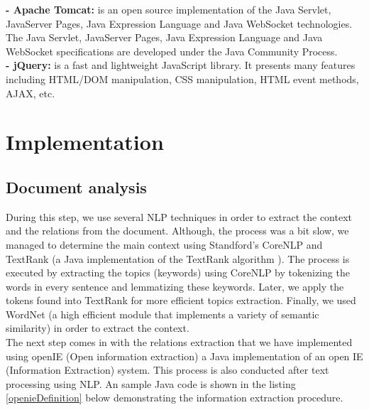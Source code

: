 \textbf{- Apache Tomcat:} is an open source implementation of the Java Servlet, JavaServer Pages, Java Expression Language and Java WebSocket technologies. The Java Servlet, JavaServer Pages, Java Expression Language and Java WebSocket specifications are developed under the Java Community Process. \\

\textbf{- jQuery:} is a fast and lightweight JavaScript library. It presents many features including HTML/DOM manipulation, CSS manipulation, HTML event methods, AJAX, etc.

\section{Implementation}
\subsection{Document analysis}

During this step, we use several NLP techniques in order to extract the context and the relations from the document. Although, the process was a bit slow, we managed to determine the main context using Standford's CoreNLP and TextRank (a Java implementation of  the TextRank algorithm \cite{textmark}). The process is executed by extracting the topics (keywords) using CoreNLP by tokenizing the words in every sentence and lemmatizing these keywords. Later, we apply the tokens found into TextRank for more efficient topics extraction. Finally, we used WordNet \cite{wordnet} (a high efficient module that implements a variety of semantic similarity) in order to extract the context.\\

The next step comes in with the relations extraction that we have implemented using openIE \cite{openie} (Open information extraction) a Java implementation of an open IE (Information Extraction) system. This process is also conducted after text processing using NLP. An sample Java code is shown in the listing \ref{openieDefinition} below demonstrating the information extraction procedure.

